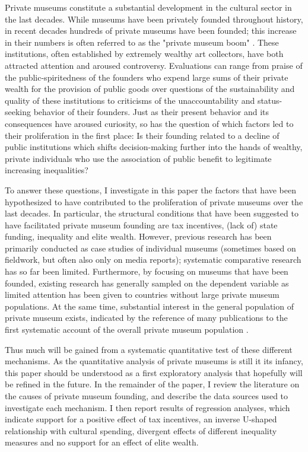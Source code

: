 \documentclass[11pt]{article}
\begin{document}
Private museums constitute a substantial development in the cultural sector in the last decades.
While museums have been privately founded throughout history, in recent decades hundreds of private museums have been founded; this increase in their numbers is often referred to as the "private museum boom" \parencite{Walker_2019_collector}. 
These institutions, often established by extremely wealthy art collectors, have both attracted attention and aroused controversy.
Evaluations can range from praise of the public-spiritedness of the founders who expend large sums of their private wealth for the provision of public goods over questions of the sustainability and quality of these institutions to criticisms of the unaccountability and status-seeking behavior of their founders. 
Just as their present behavior and its consequences have aroused curiosity, so has the question of which factors led to their proliferation in the first place:
Is their founding related to a decline of public institutions which shifts decision-making further into the hands of wealthy, private individuals who use the association of public benefit to legitimate increasing inequalities?



To answer these questions, I investigate in this paper the factors that have been hypothesized to have contributed to the proliferation of private museums over the last decades.
In particular, the structural conditions that have been suggested to have facilitated private museum founding are tax incentives, (lack of) state funding, inequality and elite wealth.
However, previous research has been primarily conducted as case studies of individual museums (sometimes based on fieldwork, but often also only on media reports); systematic comparative research has so far been limited.
Furthermore, by focusing on museums that have been founded, existing research has generally sampled on the dependent variable as limited attention has been given to countries without large private museum populations.
At the same time, substantial interest in the general population of private museum exists, indicated by the reference of many publications to the first systematic account of the overall private museum population \parencite{LarrysList_2015_report}. 

Thus much will be gained from a systematic quantitative test of these different mechanisms.
As the quantitative analysis of private museums is still it its infancy, this paper should be understood as a first exploratory analysis that hopefully will be refined in the future. 
In the remainder of the paper, I review the literature on the causes of private museum founding, and describe the data sources used to investigate each mechanism.
I then report results of regression analyses, which indicate support for a positive effect of tax incentives, an inverse U-shaped relationship with cultural spending, divergent effects of different inequality measures and no support for an effect of elite wealth.
\end{document}

